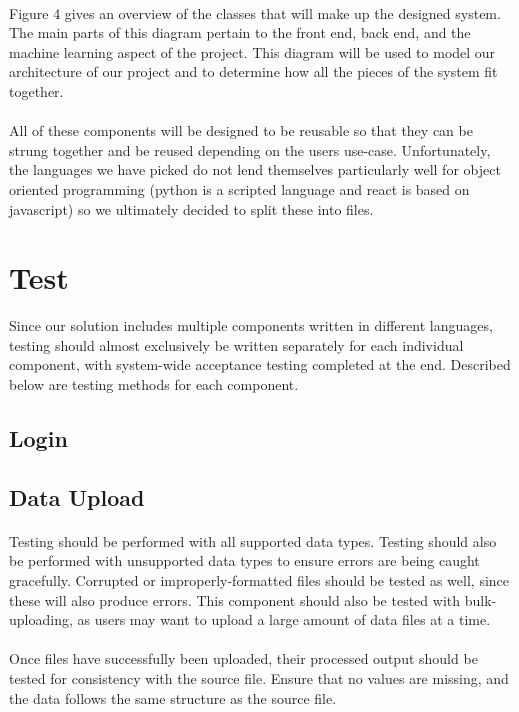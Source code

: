 \documentclass[12pt,oneside,letterpaper]{article}
\begin{document}
\paragraph{}Figure 4 gives an overview of the classes that will make up the designed system. The main parts of this diagram pertain to the front end, back end, and the machine learning aspect of the project. This diagram will be used to model our architecture of our project and to determine how all the pieces of the system fit together. 
 \paragraph{} All of these components will be designed to be reusable so that they can be strung together and be reused depending on the users use-case. Unfortunately, the languages we have picked do not lend themselves particularly well for object oriented programming (python is a scripted language and react is based on javascript) so we ultimately decided to split these into files.

\section{Test}
Since our solution includes multiple components written in different languages, testing should almost exclusively be written separately for each individual component, with system-wide acceptance testing completed at the end. Described below are testing methods for each component.

\subsection{Login}

\subsection{Data Upload}
\paragraph{} Testing should be performed with all supported data types. Testing should also be performed with unsupported data types to ensure errors are being caught gracefully. Corrupted or improperly-formatted files should be tested as well, since these will also produce errors. This component should also be tested with bulk-uploading, as users may want to upload a large amount of data files at a time.
\paragraph{} Once files have successfully been uploaded, their processed output should be tested for consistency with the source file. Ensure that no values are missing, and the data follows the same structure as the source file.
\end{document}
